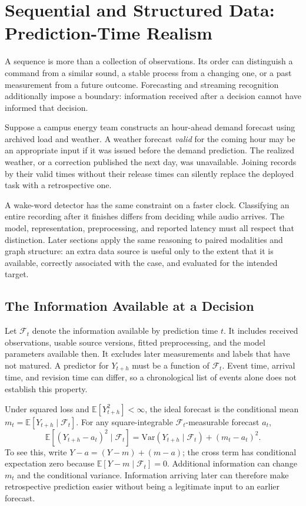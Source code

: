 \begingroup
\raggedbottom
{}
\chapter{Sequential and Structured Data: Prediction-Time Realism}
\label{ch:audio-time}

A sequence is more than a collection of observations. Its order can distinguish a command from a similar sound, a stable process from a changing one, or a past measurement from a future outcome. Forecasting and streaming recognition additionally impose a boundary: information received after a decision cannot have informed that decision.

Suppose a campus energy team constructs an hour-ahead demand forecast using archived load and weather. A weather forecast \emph{valid} for the coming hour may be an appropriate input if it was issued before the demand prediction. The realized weather, or a correction published the next day, was unavailable. Joining records by their valid times without their release times can silently replace the deployed task with a retrospective one.

A wake-word detector has the same constraint on a faster clock. Classifying an entire recording after it finishes differs from deciding while audio arrives. The model, representation, preprocessing, and reported latency must all respect that distinction. Later sections apply the same reasoning to paired modalities and graph structure: an extra data source is useful only to the extent that it is available, correctly associated with the case, and evaluated for the intended target.

\section{The Information Available at a Decision}

Let $\mathcal F_t$ denote the information available by prediction time $t$. It includes received observations, usable source versions, fitted preprocessing, and the model parameters available then. It excludes later measurements and labels that have not matured. A predictor for $Y_{t+h}$ must be a function of $\mathcal F_t$. Event time, arrival time, and revision time can differ, so a chronological list of events alone does not establish this property.

Under squared loss and $\mathbb E[Y_{t+h}^2]<\infty$, the ideal forecast is the conditional mean $m_t=\mathbb E[Y_{t+h}\mid\mathcal F_t]$. For any square-integrable $\mathcal F_t$-measurable forecast $a_t$,
\[
 \mathbb E[(Y_{t+h}-a_t)^2\mid\mathcal F_t]
 =\mathrm{Var}(Y_{t+h}\mid\mathcal F_t)+(m_t-a_t)^2.
\]
To see this, write $Y-a=(Y-m)+(m-a)$; the cross term has conditional expectation zero because $\mathbb E[Y-m\mid\mathcal F_t]=0$. Additional information can change $m_t$ and the conditional variance. Information arriving later can therefore make retrospective prediction easier without being a legitimate input to an earlier forecast.

